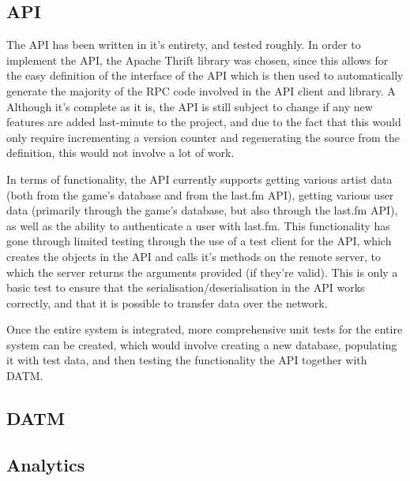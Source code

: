 \documentclass[a4paper,10pt,twoside]{article}
\begin{document}
\subsection{API}

The API has been written in it's entirety, and tested roughly. In order to implement the API, the Apache Thrift library was chosen, since this allows for the easy definition of the interface of the API which is then used to automatically generate the majority of the RPC code involved in the API client and library. A Although it's complete as it is, the API is still subject to change if any new features are added last-minute to the project, and due to the fact that this would only require incrementing a version counter and regenerating the source from the definition, this would not involve a lot of work.

In terms of functionality, the API currently supports getting various artist data (both from the game's database and from the last.fm API), getting various user data (primarily through the game's database, but also through the last.fm API), as well as the ability to authenticate a user with last.fm. This functionality has gone through limited testing through the use of a test client for the API, which creates the objects in the API and calls it's methods on the remote server, to which the server returns the arguments provided (if they're valid). This is only a basic test to ensure that the serialisation/deserialisation in the API works correctly, and that it is possible to transfer data over the network.

Once the entire system is integrated, more comprehensive unit tests for the entire system can be created, which would involve creating a new database, populating it with test data, and then testing the functionality the API together with DATM. 

\subsection{DATM}
\subsection{Analytics}
\end{document}
